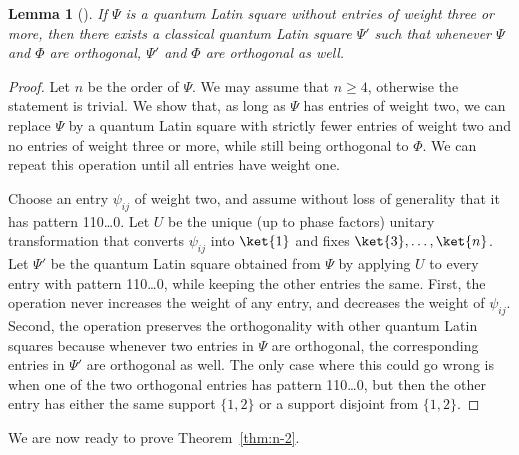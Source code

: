 \documentclass[a4paper]{article}
\newtheorem{lemma}[theorem]{Lemma}
\theoremstyle{definition}
\begin{document}
\begin{lemma}[{\cite[Lemma~13]{36paper}}]\label{lem:weight2}
    If \(\Psi\) is a quantum Latin square without entries of weight three or more, then there exists a classical quantum Latin square \(\Psi'\) such that whenever \(\Psi\) and \(\Phi\) are orthogonal, \(\Psi'\) and \(\Phi\) are orthogonal as well.
\end{lemma}
\begin{proof}
    Let \(n\) be the order of \(\Psi\). We may assume that \(n\geq4\), otherwise the statement is trivial.
    We show that, as long as \(\Psi\) has entries of weight two, we can replace \(\Psi\) by a quantum Latin square with strictly fewer entries of weight two and no entries of weight three or more, while still being orthogonal to \(\Phi\). We can repeat this operation until all entries have weight one.
    
    Choose an entry \(\psi_{ij}\) of weight two, and assume without loss of generality that it has pattern 110\dots0. Let \(U\) be the unique (up to phase factors) unitary transformation that converts \(\psi_{ij}\) into \(\ket{1}\) and fixes \(\ket{3},\dots,\ket{n}\).
    Let \(\Psi'\) be the quantum Latin square obtained from \(\Psi\) by applying \(U\) to every entry with pattern 110\dots0, while keeping the other entries the same.
    First, the operation never increases the weight of any entry, and decreases the weight of \(\psi_{ij}\). Second, the operation preserves the orthogonality with other quantum Latin squares because whenever two entries in \(\Psi\) are orthogonal, the corresponding entries in \(\Psi'\) are orthogonal as well. The only case where this could go wrong is when one of the two orthogonal entries has pattern 110\dots0, but then the other entry has either the same support \(\{1,2\}\) or a support disjoint from \(\{1,2\}\). 
\end{proof}

We are now ready to prove Theorem~\ref{thm:n-2}.
\end{document}
